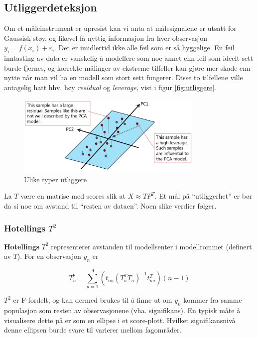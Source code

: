 \subsection{Utliggerdeteksjon}
Om et måleinstrument er upresist kan vi anta at målesignalene er utsatt for Gaussisk støy, og likevel få nyttig informasjon fra hver observasjon $y_i = f(x_i) + \varepsilon_i$. Det er imidlertid ikke alle feil som er så hyggelige. En feil inntasting av data er vanskelig å modellere som noe annet enn feil som ideelt sett burde fjernes, og korrekte målinger av ekstreme tilfeller kan gjøre mer skade enn nytte når man vil ha en modell som stort sett fungerer. Disse to tilfellene ville antagelig hatt hhv. høy \textit{residual} og \textit{leverage}, vist i figur \ref{fig:utliggere}.

\begin{figure}[h]
	\centering
	\includegraphics[width=0.8\textwidth]{figurer/utligger_illustrasjon.png}
	\caption{Ulike typer utliggere}
	\label{fig:fig:utliggere}
\end{figure}

La $T$ være en matrise med scores slik at $X \approx T P^T$. Et mål på ``utliggerhet'' er bør da si noe om avstand til ``resten av dataen''. Noen slike verdier følger.

\subsubsection{Hotellings $T^2$}
\textbf{Hotellings} $T^2$ representerer avstanden til modellsenter i modellrommet (definert av $T$). For en observasjon $y_n$ er

\begin{equation}
	T_n^2 = \sum_{a=1}^A (t_{na} (T_a ^T T_a)^{-1} t_{na}^T) (n-1)
	\label{eq:hotelling_T2}
\end{equation}

$T^2$ er F-fordelt, og kan dermed brukes til å finne ut om $y_n$ kommer fra samme populasjon som resten av observasjonene (vha. signifikans). En typisk måte å visualisere dette på er som en ellipse i et score-plott. Hvilket signifikansnivå denne ellipsen burde svare til varierer mellom fagområder.

